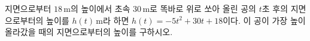 지면으로부터 $18\,\mathrm{m}$의 높이에서 초속 $30\,\mathrm{m}$로 똑바로 위로 쏘아 올린 공의 $t$초 후의 지면으로부터의 높이를 $h(t)\,\mathrm{m}$라 하면 $h(t)=-5t^2+30t+18$이다. 이 공이 가장 높이 올라갔을 때의 지면으로부터의 높이를 구하시오. 
